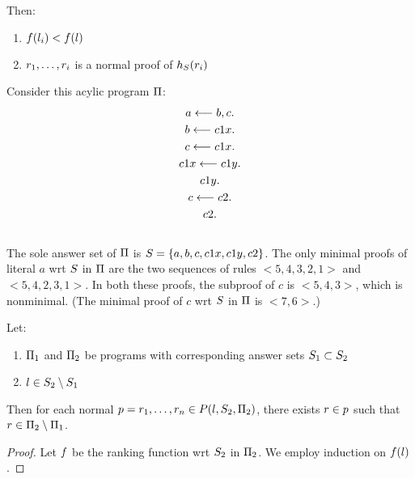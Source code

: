 \documentclass{paper}
\begin{document}
\begin{flushleft}
\begin{remark}
Then:
\begin{enumerate}
\item
$f({l}_{i}) < f(l)$
\item
${r}_{1}, \ldots, {r}_{i}$ is a normal proof of $h_S({r}_{i})$
\end{enumerate}

\end{remark}

\begin{example}

Consider this acylic \ap{} program $\Pi$:
\begin{gather}
a \longleftarrow b, c. \\
b \longleftarrow c1x. \\
c \longleftarrow c1x. \\
c1x \longleftarrow c1y. \\
c1y. \\
c \longleftarrow c2. \\
c2.
\end{gather} \\
The sole answer set of $\Pi$ is
$S = \{a, b, c, c1x, c1y, c2\}$.
The only minimal proofs of literal $a$ wrt
$S$ in $\Pi$ are
the two sequences of rules $<5, 4, 3, 2, 1>$ and
$<5, 4, 2, 3, 1>$.
In both these proofs, the subproof of $c$ is $<5, 4, 3>$,
which is nonminimal.
(The minimal proof of $c$ wrt $S$ in $\Pi$ is $<7, 6>$.)

\end{example}

\begin{lemma}
\label{rule_in_P2}

Let:
\begin{enumerate}
\item
${\Pi}_{1}$ and ${\Pi}_{2}$ be \hcf{} \ap{} programs with
corresponding answer sets ${S}_{1} \subset {S}_{2}$
\item
$l \in {S}_{2} \setminus {S}_{1}$
\end{enumerate}

Then for each normal
$p = {r}_{1}, \ldots, {r}_{n} \in P({l}, {{S}_{2}}, {{\Pi}_{2}})$,
there exists $r \in p$ such that
$r \in {\Pi}_{2} \setminus {\Pi}_{1}$.

\end{lemma}

\begin{proof}

Let $f$ be the ranking function
wrt ${S}_{2}$ in ${\Pi}_{2}$.
We employ induction on $f(l)$.


\end{proof}
\end{flushleft}
\end{document}
